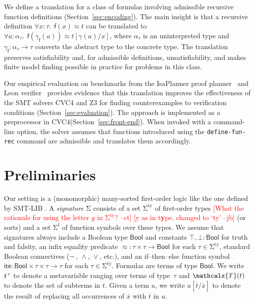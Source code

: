 \documentclass[runningheads,a4paper]{llncs}
\newcommand{\con}[1]{\mathsf{#1}}
\let\const=\con
\renewcommand\vec[1]{\overline{#1}}
\let\oldSigma=\Sigma
\def\Sigma{\mathrm{\oldSigma}}
\let\oldneg=\neg
\def\neg{\oldneg\;}
\let\oldvee=\vee
\def\vee{\mathrel{\oldvee}}
\let\oldwedge=\wedge
\def\wedge{\mathrel{\oldwedge}}
\newcommand\cvc{CVC4\xspace}
\newcommand\ziii{Z3\xspace}
\newcommand{\teq}{\approx}
\newcommand{\terms}{\mathcalx{T}}
\newcommand{\stypes}[1]{#1^\mathrm{ty}}
\newcommand{\sfuns}[1]{#1^\mathrm{f}}
\newcommand\ty[1]{\con{#1}}
\newcommand{\Bool}{\ty{Bool}}
\newcommand{\ltrue}{\top}
\newcommand{\lfalse}{\bot}
\newcommand{\lite}{\con{ite}}
\newcommand\concret{\gamma} %
\newcommand{\farg}[1]{\concret_{#1}}
\newcommand{\fargtype}[1]{\alpha_{#1}}
\newcommand{\rem}[1]{\textcolor{red}{[#1]}}
\newcommand{\jb}[1]{\rem{#1 --jb}}
\newcommand{\ct}[1]{\rem{#1 --ct}}
\newcommand{\vthinspace}{\kern+0.083333em}
\newcommand{\typ}[1]{^{\vthinspace #1}}
\begin{document}
We define a translation for a class of
formulas involving admissible recursive function definitions
(Section~\ref{sec:encoding}). The main insight is that a
recursive definition $\forall x : \tau.\;\, \const{f}(x) \teq t$
can be translated to
$\forall a :
\fargtype{\tau}.\;\, \const{f}(\farg{\con{f}}(a)) \teq t[\concret(a)/x]$, where
$\fargtype{\tau}$ is an uninterpreted  type and $\farg{\con{f}} :
\fargtype{\tau} \to \tau$ converts the abstract type to the concrete
type. The translation preserves satisfiability and, for admissible definitions,
unsatisfiability, and makes finite model finding possible in practice
for problems in this class.

Our empirical evaluation on benchmarks from the IsaPlanner proof planner~\cite{} and Leon verifier~\cite{} provides
evidence that this translation improves the effectiveness of the SMT solvers
\cvc and \ziii for finding counterexamples to verification conditions
(Section~\ref{sec:evaluation}). The approach is implemented as a preprocessor
in \cvc (Section~\ref{sec:front-end}). When invoked with a
command-line option, the solver assumes that functions introduced using the
\texttt{define-fun-rec} command are admissible and translates them accordingly.


\section{Preliminaries}
\label{sec:prelim}

Our setting is a (monomorphic) many-sorted first-order logic
like the one defined by SMT-LIB \cite{smtlib25}.
A \emph{signature} $\Sigma$ consists of
a set $\stypes{\Sigma}$ of %
first-order types
%
\ct{What the rationale for using the letter $y$ in $\stypes{\Sigma}$?}
\jb{y as in t\textbf{y}pe. changed to `ty'}
(or sorts) and a set $\sfuns{\Sigma}$ of function symbols over these types.
We assume that signatures always include a Boolean type $\Bool$ and constants
$\ltrue, \lfalse : \Bool$ for truth and falsity,
an infix equality predicate ${\teq} : \tau \times \tau \to \Bool$
for each $\tau \in \stypes{\Sigma}$,
standard Boolean connectives ($\neg$, $\wedge$, $\vee$, etc.),
and an if--then--else function symbol
$\lite : \Bool \times \tau \times \tau \rightarrow \tau$
for each $\tau \in \stypes{\Sigma}$.
Formulas are terms of type $\Bool$.
We write $t\typ{\tau}$ to denote a metavariable ranging over terms of
type~$\tau$ and $\terms( t )$ to denote the set of subterms in $t$.
Given a term $u$, we write $u[\vec t/\vec x]$ to denote the result of replacing
all occurrences of $\vec x$ with $\vec t$ in $u$.
\end{document}
